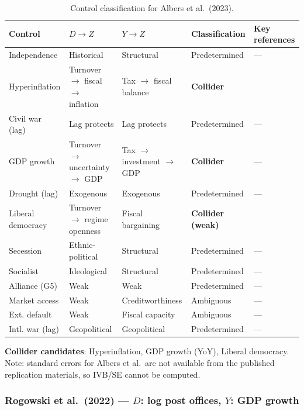 \documentclass[
]{article}
\begin{document}
\begin{table}[H]
\centering
\small
\caption{Control classification for Albers et al.\ (2023).}
\begin{tabular}{llllp{3cm}}
\toprule
Control & $D \to Z$ & $Y \to Z$ & Classification & Key references \\
\midrule
Independence & Historical & Structural & Predetermined & --- \\
Hyperinflation & Turnover $\to$ fiscal $\to$ inflation & Tax $\to$ fiscal balance & \textbf{Collider} & \citet{sargent_wallace1981} \\
Civil war (lag) & Lag protects & Lag protects & Predetermined & --- \\
GDP growth & Turnover $\to$ uncertainty $\to$ GDP & Tax $\to$ investment $\to$ GDP & \textbf{Collider} & --- \\
Drought (lag) & Exogenous & Exogenous & Predetermined & --- \\
Liberal democracy & Turnover $\to$ regime openness & Fiscal bargaining & \textbf{Collider (weak)} & \citet{besley_persson2011} \\
Secession & Ethnic-political & Structural & Predetermined & --- \\
Socialist & Ideological & Structural & Predetermined & --- \\
Alliance (G5) & Weak & Weak & Predetermined & --- \\
Market access & Weak & Creditworthiness & Ambiguous & --- \\
Ext. default & Weak & Fiscal capacity & Ambiguous & --- \\
Intl. war (lag) & Geopolitical & Geopolitical & Predetermined & --- \\
\bottomrule
\end{tabular}
\end{table}

\textbf{Collider candidates}: Hyperinflation, GDP growth (YoY), Liberal
democracy. Note: standard errors for Albers et al.~are not available
from the published replication materials, so IVB/SE cannot be computed.

\subsubsection{\texorpdfstring{Rogowski et al.~(2022) --- \(D\): log
post offices, \(Y\): GDP
growth}{Rogowski et al.~(2022) --- D: log post offices, Y: GDP growth}}\label{rogowski-et-al.-2022-d-log-post-offices-y-gdp-growth}
\end{document}
